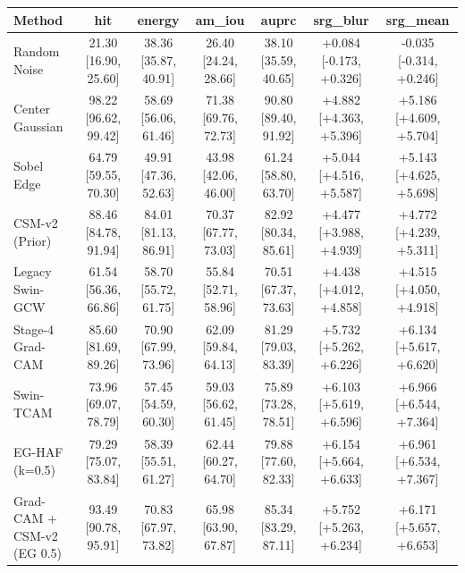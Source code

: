 \begin{tabular}{lcccccc}
\toprule
Method & hit & energy & am\_iou & auprc & srg\_blur & srg\_mean \\
\midrule
Random Noise & 21.30 [16.90, 25.60] & 38.36 [35.87, 40.91] & 26.40 [24.24, 28.66] & 38.10 [35.59, 40.65] & +0.084 [-0.173, +0.326] & -0.035 [-0.314, +0.246] \\
Center Gaussian & 98.22 [96.62, 99.42] & 58.69 [56.06, 61.46] & 71.38 [69.76, 72.73] & 90.80 [89.40, 91.92] & +4.882 [+4.363, +5.396] & +5.186 [+4.609, +5.704] \\
Sobel Edge & 64.79 [59.55, 70.30] & 49.91 [47.36, 52.63] & 43.98 [42.06, 46.00] & 61.24 [58.80, 63.70] & +5.044 [+4.516, +5.587] & +5.143 [+4.625, +5.698] \\
CSM-v2 (Prior) & 88.46 [84.78, 91.94] & 84.01 [81.13, 86.91] & 70.37 [67.77, 73.03] & 82.92 [80.34, 85.61] & +4.477 [+3.988, +4.939] & +4.772 [+4.239, +5.311] \\
Legacy Swin-GCW & 61.54 [56.36, 66.86] & 58.70 [55.72, 61.75] & 55.84 [52.71, 58.96] & 70.51 [67.37, 73.63] & +4.438 [+4.012, +4.858] & +4.515 [+4.050, +4.918] \\
Stage-4 Grad-CAM & 85.60 [81.69, 89.26] & 70.90 [67.99, 73.96] & 62.09 [59.84, 64.13] & 81.29 [79.03, 83.39] & +5.732 [+5.262, +6.226] & +6.134 [+5.617, +6.620] \\
Swin-TCAM & 73.96 [69.07, 78.79] & 57.45 [54.59, 60.30] & 59.03 [56.62, 61.45] & 75.89 [73.28, 78.51] & +6.103 [+5.619, +6.596] & +6.966 [+6.544, +7.364] \\
EG-HAF (k=0.5) & 79.29 [75.07, 83.84] & 58.39 [55.51, 61.27] & 62.44 [60.27, 64.70] & 79.88 [77.60, 82.33] & +6.154 [+5.664, +6.633] & +6.961 [+6.534, +7.367] \\
Grad-CAM + CSM-v2 (EG 0.5) & 93.49 [90.78, 95.91] & 70.83 [67.97, 73.82] & 65.98 [63.90, 67.87] & 85.34 [83.29, 87.11] & +5.752 [+5.263, +6.234] & +6.171 [+5.657, +6.653] \\
\bottomrule
\end{tabular}
